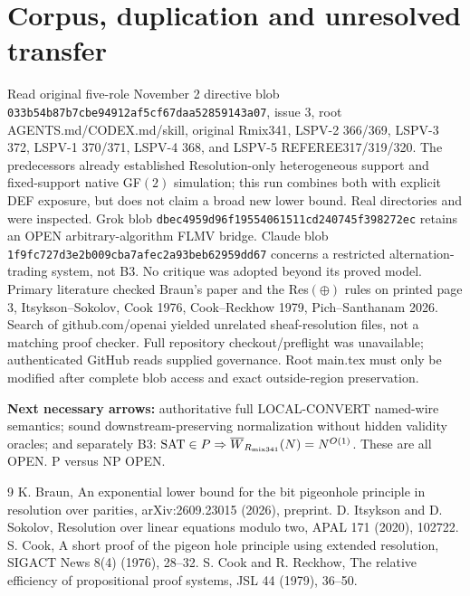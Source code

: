 \documentclass[11pt]{article}
\begin{document}
\section*{Corpus, duplication and unresolved transfer}
Read original five-role November 2 directive blob \texttt{033b54b87b7cbe94912af5cf67daa52859143a07}, issue 3, root AGENTS.md/CODEX.md/skill, original Rmix341, LSPV-2 366/369, LSPV-3 372, LSPV-1 370/371, LSPV-4 368, and LSPV-5 REFEREE317/319/320. The predecessors already established Resolution-only heterogeneous support and fixed-support native GF$(2)$ simulation; this run combines both with explicit DEF exposure, but does not claim a broad new lower bound. Real directories  and  were inspected. Grok  blob \texttt{dbec4959d96f19554061511cd240745f398272ec} retains an OPEN arbitrary-algorithm FLMV bridge. Claude  blob \texttt{1f9fc727d3e2b009cba7afec2a93beb62959dd67} concerns a restricted alternation-trading system, not B3. No critique was adopted beyond its proved model. Primary literature checked Braun's paper and the Res$(\oplus)$ rules on printed page 3, Itsykson--Sokolov, Cook 1976, Cook--Reckhow 1979, Pich--Santhanam 2026. Search of github.com/openai yielded unrelated sheaf-resolution files, not a matching proof checker. Full repository checkout/preflight was unavailable; authenticated GitHub reads supplied governance. Root main.tex must only be modified after complete blob access and exact outside-region preservation.

\noindent\textbf{Next necessary arrows:} authoritative full LOCAL-CONVERT named-wire semantics; sound downstream-preserving normalization without hidden validity oracles; and separately B3: $\mathrm{SAT}\in P\Rightarrow\overline W_{R_{\rm mix341}}(N)=N^{O(1)}$. These are all OPEN. P versus NP OPEN.
\begin{thebibliography}{9}
 K. Braun, An exponential lower bound for the bit pigeonhole principle in resolution over parities, arXiv:2609.23015 (2026), preprint.
 D. Itsykson and D. Sokolov, Resolution over linear equations modulo two, APAL 171 (2020), 102722.
 S. Cook, A short proof of the pigeon hole principle using extended resolution, SIGACT News 8(4) (1976), 28--32.
 S. Cook and R. Reckhow, The relative efficiency of propositional proof systems, JSL 44 (1979), 36--50.
\end{thebibliography}
\end{document}
